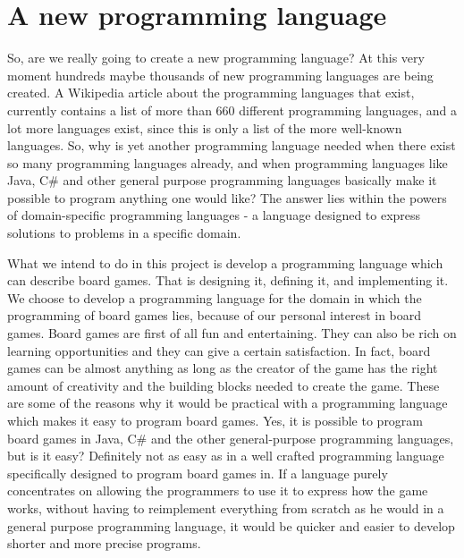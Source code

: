 \chapter{A new programming language}
\label{chap:introduction}

So, are we really going to create a new programming language? At this very
moment hundreds maybe thousands of new programming languages are being created.
A Wikipedia article about the programming languages that exist, currently
contains a list of more than 660 different programming
languages,\cite{listofprogramminglanguages} and a lot more languages exist,
since this is only a list of the more well-known languages. So, why is yet
another programming language needed when there exist so many programming
languages already, and when programming languages like Java, C\# and other
general purpose programming languages basically make it possible to program
anything one would like? The answer lies within the powers of domain-specific
programming languages - a language designed to express solutions to problems in
a specific domain.\cite{domainspecificprogramminglanguagedefinition}

What we intend to do in this project is develop a programming language which can
describe board games. That is designing it, defining it, and implementing it. We
choose to develop a programming language for the domain in which the programming
of board games lies, because of our personal interest in board games.
Board games are first of all fun and entertaining. They can also be rich on
learning opportunities \cite{whyboardgames1?} and they can give a certain
satisfaction. \cite{whyboardgames2?} In fact, board games can be almost anything
as long as the creator of the game has the right amount of creativity and the
building blocks needed to create the game. These are some of the reasons why it
would be practical with a programming language which makes it easy to program
board games. Yes, it is possible to program board games in Java, C\# and the
other general-purpose programming languages, but is it easy? Definitely not as
easy as in a well crafted programming language specifically designed to program
board games in. If a language purely concentrates on allowing the programmers to
use it to express how the game works, without having to reimplement everything
from scratch as he would in a general purpose programming language, it would be
quicker and easier to develop shorter and more precise programs.  

